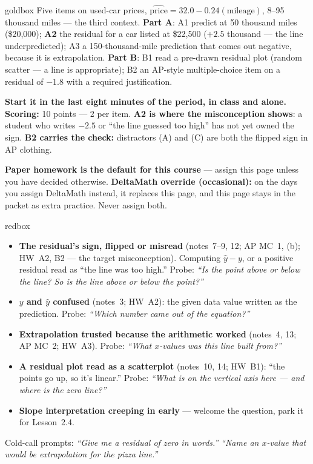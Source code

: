 \documentclass[10pt]{article}
\begin{document}
\boxguard
\begin{skillbox}{goldbox}
Five items on used-car prices, $\widehat{\text{price}} = 32.0 - 0.24(\text{mileage})$, 8--95
thousand miles --- the third context. \textbf{Part A}: A1 predict at 50 thousand miles
(\$20{,}000); \textbf{A2} the residual for a car listed at \$22{,}500 ($+2.5$ thousand --- the
line underpredicted); A3 a 150-thousand-mile prediction that comes out negative, because it is
extrapolation. \textbf{Part B}: B1 read a pre-drawn residual plot (random scatter --- a line is
appropriate); B2 an AP-style multiple-choice item on a residual of $-1.8$ with a required
justification.

\textbf{Start it in the last eight minutes of the period, in class and alone.}
\textbf{Scoring:} 10 points --- 2 per item. \textbf{A2 is where the misconception shows}: a
student who writes $-2.5$ or ``the line guessed too high'' has not yet owned the sign.
\textbf{B2 carries the check:} distractors (A) and (C) are both the flipped sign in AP clothing.

\textbf{Paper homework is the default for this course} --- assign this page unless you have
decided otherwise. \textbf{DeltaMath override (occasional):} on the days you assign DeltaMath
instead, it replaces this page, and this page
stays in the packet as extra practice. Never assign both.
\end{skillbox}

\boxguard
\begin{skillbox}{redbox}
\begin{itemize}[leftmargin=1.2em, nosep]
  \item \textbf{The residual's sign, flipped or misread} (notes~7--9, 12; AP MC~1, (b); HW~A2,
        B2 --- the target misconception). Computing $\hat{y} - y$, or a positive residual read
        as ``the line was too high.'' Probe: \emph{``Is the point above or below the line?
        So is the line above or below the point?''}
  \item \textbf{$y$ and $\hat{y}$ confused} (notes~3; HW~A2): the given data value written as
        the prediction. Probe: \emph{``Which number came out of the equation?''}
  \item \textbf{Extrapolation trusted because the arithmetic worked} (notes~4, 13; AP MC~2;
        HW~A3). Probe: \emph{``What $x$-values was this line built from?''}
  \item \textbf{A residual plot read as a scatterplot} (notes~10, 14; HW~B1): ``the points go
        up, so it's linear.'' Probe: \emph{``What is on the vertical axis here --- and where
        is the zero line?''}
  \item \textbf{Slope interpretation creeping in early} --- welcome the question, park it for
        Lesson~2.4.
\end{itemize}
Cold-call prompts: \emph{``Give me a residual of zero in words.''} \quad \emph{``Name an
$x$-value that would be extrapolation for the pizza line.''}
\end{skillbox}
\end{document}

